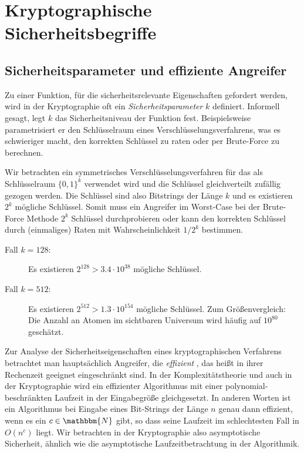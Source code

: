 \chapter{Kryptographische  Sicherheitsbegriffe}
\label{chap:krypt-begriffe}
\section{Sicherheitsparameter und effiziente  Angreifer}
\label{sec:secparam} 
Zu einer Funktion, für die sicherheitsrelevante Eigenschaften gefordert
werden, wird in der Kryptographie oft ein \emph{Sicherheitsparameter}
\indexSecParam $k$ definiert. Informell gesagt, legt $k$ das
Sicherheitsniveau der Funktion fest. Beispielsweise parametrisiert er
den Schlüsselraum eines Verschlüsselungsverfahrens, was es schwieriger
macht, den korrekten Schlüssel zu raten oder per Brute-Force zu
berechnen.
\begin{beispiel} Wir betrachten ein symmetrisches
  Verschlüsselungsverfahren für das als Schlüsselraum $\{0,1\}^k$
  verwendet wird und die Schlüssel gleichverteilt zufällig gezogen
  werden. Die Schlüssel sind also Bitstrings der Länge $k$ und es
  existieren $2^k$ mögliche Schlüssel. Somit muss ein Angreifer im
  Worst-Case bei der Brute-Force Methode $2^k$ Schlüssel durchprobieren
  oder kann den korrekten Schlüssel durch (einmaliges) Raten mit
  Wahrscheinlichkeit $1/2^k$ bestimmen.
  \begin{description}
  \item[Fall $k=128$:] Es existieren $2^{128} > 3.4 \cdot
    10^{38}$ mögliche Schlüssel.
  \item[Fall $k=512$:] Es existieren $2^{512} > 1.3 \cdot
    10^{154}$ mögliche Schlüssel. Zum Größenvergleich: Die Anzahl an Atomen
    im sichtbaren Universum wird häufig auf $10^{80}$ geschätzt.
  \end{description}
  
\end{beispiel}

Zur Analyse der Sicherheitseigenschaften eines kryptographischen
Verfahrens betrachtet man hauptsächlich Angreifer, die \emph{effizient}
\indexEfficientAdv, das heißt in ihrer Rechenzeit geeignet eingeschränkt
sind. In der Komplexitätstheorie und auch in der Kryptographie wird ein
effizienter Algorithmus mit einer polynomial-beschränkten Laufzeit in
der Eingabegröße gleichgesetzt.  In anderen Worten ist ein Algorithmus
bei Eingabe eines Bit-Strings der Länge $n$ genau dann effizient, wenn
es ein $c \in \mathbbm{N}$ gibt, so dass seine Laufzeit im schlechtesten
Fall in $O(n^c)$ liegt. Wir betrachten in der Kryptographie also
asymptotische Sicherheit, ähnlich wie die asymptotische
Laufzeitbetrachtung in der Algorithmik.

